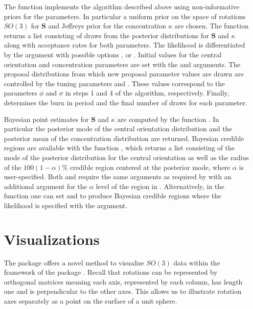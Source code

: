 The function   implements the algorithm described above using non-informative priors for the parameters.  In particular a uniform prior on the space of rotations $SO(3)$ for $\bm S$ and Jeffreys prior for the concentration $\kappa$ are chosen. The function returns a list consisting of draws from the posterior distributions for $\bm S$ and $\kappa$ along with acceptance rates for both parameters.  The likelihood is differentiated by the  argument with possible options ,  or .  Initial values for the central orientation and concentration parameters are set with the   and  arguments.  The proposal distributions from which new proposal parameter values are drawn are controlled by the tuning parameters  and .  These values correspond to the parameters $\phi$ and $\sigma$ in steps 1 and 4 of the algorithm, respectively.   Finally,   determines the burn in period and  the final number of draws for each parameter.  %

Bayesian point estimates for $\bm S$ and $\kappa$ are computed by the function .  In particular the posterior mode of the central orientation distribution and the posterior mean of the concentration distribution are returned.  Bayesian credible regions are available with the function , which returns a list consisting of the mode of the posterior distribution for the central orientation as well as the radius of the $100(1-\alpha)\%$ credible region centered at the posterior mode, where $\alpha$ is user-specified.    Both  and  require the same arguments as required by  with an additional argument for the $\alpha$ level of the region in .  Alternatively, in the  function one can set  and  to produce Bayesian credible regions where the likelihood is specified with the  argument.

\section{Visualizations}

The  package offers a novel method to visualize $SO(3)$ data within the framework of the  package \citep{wickham2009}.  Recall that rotations can be represented by orthogonal matrices meaning each axis, represented by each column, has length one and is perpendicular to the other axes.  This allows us to illustrate rotation axes separately as a point on the surface of a unit sphere.

